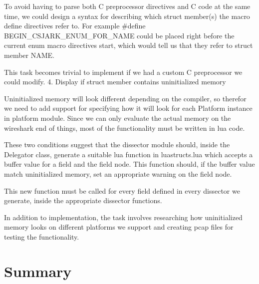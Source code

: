 To avoid having to parse both C preprocessor directives and C code at the same time, we could design a syntax for describing which struct member(s) the macro define directives refer to. For example #define BEGIN_CSJARK_ENUM_FOR_NAME could be placed right before the current enum macro directives start, which would tell us that they refer to struct member NAME.

This task becomes trivial to implement if we had a custom C preprocessor we could modify.
4. Display if struct member contains uninitialized memory

Uninitialized memory will look different depending on the compiler, so therefor we need to add support for specifying how it will look for each Platform instance in platform module. Since we can only evaluate the actual memory on the wireshark end of things, most of the functionality must be written in lua code.

These two conditions suggest that the dissector module should, inside the Delegator class, generate a suitable lua function in luastructs.lua which accepts a buffer value for a field and the field node. This function should, if the buffer value match uninitialized memory,  set an appropriate warning on the field node.

This new function must be called for every field defined in every dissector we generate, inside the appropriate dissector functions.

In addition to implementation, the task involves researching how uninitialized memory looks on different platforms we support and creating pcap files for testing the functionality.

\section{Summary}


